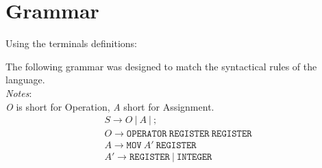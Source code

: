 \documentclass[]{article}
\begin{document}
    \section{Grammar}

    Using the terminals definitions: \\

    
    
    
    

    \noindent
    The following grammar was designed to match the syntactical rules of the language.\\

    \noindent
    \textit{Notes}:\\
    \textit{O} is short for Operation, \textit{A} short for Assignment. \\

    \begin{gather*}
        S \rightarrow O\ |\ A\ |\ ; \\
        O \rightarrow \mathtt{OPERATOR}\ \mathtt{REGISTER}\ \mathtt{REGISTER} \\
        A \rightarrow \mathtt{MOV}\ A'\ \mathtt{REGISTER} \\
        A' \rightarrow \mathtt{REGISTER}\ |\ \mathtt{INTEGER}\\
    \end{gather*}

  
\end{document}
